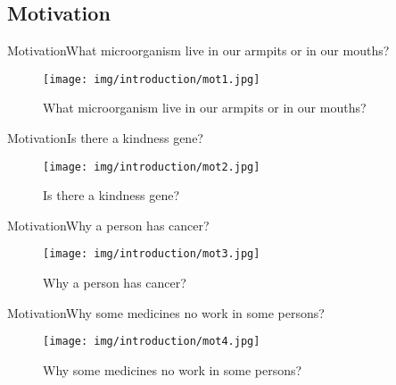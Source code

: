 \documentclass[10pt]{beamer}
\newcommand{\1}{
        	\setbeamertemplate{background}{
        		\texttt{[image: img/1]}
        		\tikz[overlay] \fill[fill opacity=0.75,fill=white] (0,0) rectangle (-\paperwidth,\paperheight);
        	}
}
\begin{document}
\subsection{Motivation}

\begin{frame}{Motivation}{What microorganism live in our armpits or in our mouths?}
	\begin{figure}[]
		\centering
		\texttt{[image: img/introduction/mot1.jpg]}
		\label{img:mot1}
		\caption{What microorganism live in our armpits or in our mouths?}
	\end{figure}
\end{frame}

\begin{frame}{Motivation}{Is there a kindness gene?
	}
	\begin{figure}[]
		\centering
		\texttt{[image: img/introduction/mot2.jpg]}
		\label{img:mot2}
		\caption{Is there a kindness gene?}
	\end{figure}
\end{frame}

\begin{frame}{Motivation}{Why a person has cancer?}
	\begin{figure}[]
		\centering
		\texttt{[image: img/introduction/mot3.jpg]}
		\label{img:mot2}
		\caption{Why a person has cancer?}
	\end{figure}
\end{frame}

\begin{frame}{Motivation}{Why some medicines no work in some persons?}
	\begin{figure}[]
		\centering
		\texttt{[image: img/introduction/mot4.jpg]}
		\label{img:mot2}
		\caption{Why some medicines no work in some persons?}
	\end{figure}
\end{frame}
\end{document}
